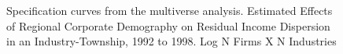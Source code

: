 \documentclass{article}
\begin{document}
\begin{figure}[htbp]
  \centering
  \caption{Specification curves from the multiverse analysis. Estimated Effects of Regional Corporate Demography on Residual Income Dispersion in an Industry-Township, 1992 to 1998.  Log N Firms X N Industries}
  \label{fig:gross_income}
  
\end{figure}


\clearpage %
\end{document}
